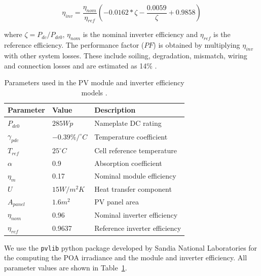 \begin{equation}
    \eta_{inv} = \frac{\eta_{nom}}{\eta_{ref}} \left( -0.0162 * \zeta - \frac{0.0059}{\zeta} + 0.9858 \right)
\end{equation}

where $\zeta = P_{dc}/P_{dc0}$, $\eta_{nom}$ is the nominal inverter efficiency and $\eta_{ref}$ is the reference efficiency. 
%
The performance factor ($PF$) is obtained by multiplying $\eta_{inv}$ with other system losses. These include soiling, degradation, mismatch, wiring and connection losses and are estimated as 14\% \cite{dobos_pvwatts_2014}. 

\begin{table}[htbp]
\centering
\footnotesize
\caption{Parameters used in the PV module and inverter efficiency models \cite{dobos_pvwatts_2014, faiman_assessing_2008}.}
\label{tab:efficiency}

    \begin{tabular}{lll}
    \hline
    \textbf{Parameter} & \textbf{Value}     & \textbf{Description}          \\ \hline
    $P_{dc0}$          & $285 Wp$           & Nameplate DC rating           \\
    $\gamma_{pdc}$     & $-0.39\%/ ^\circ C$& Temperature coefficient       \\
    $T_{ref}$          & $25^\circ C$       & Cell reference temperature    \\
    $\alpha$           & 0.9                & Absorption coefficient        \\
    $\eta_m$           & 0.17               & Nominal module efficiency     \\
    $U$                & $15 W/m^2K$        & Heat transfer component       \\
    $A_{panel}$        & $1.6 m^2$          & PV panel area                 \\
    $\eta_{nom}$       & 0.96               & Nominal inverter efficiency   \\
    $\eta_{ref}$       & 0.9637             & Reference inverter efficiency \\ \hline
    \end{tabular}
\end{table}

We use the \texttt{pvlib} python package developed by Sandia National Laboratories \cite{holmgren_pvlib_2018} for the computing the POA irradiance and the module and inverter efficiency. All parameter values are shown in Table~\ref{tab:efficiency}.


